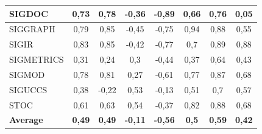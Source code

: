 \begin{table}[!htb]
{\begin{tabular}{|l|c|c|c|c|c|c|c|}
SIGDOC & 0,73 & 0,78 & -0,36 & -0,89 & 0,66 & 0,76 & 0,05\\ \hline
SIGGRAPH & 0,79 & 0,85 & -0,45 & -0,75 & 0,94 & 0,88 & 0,55\\ \hline
SIGIR & 0,83 & 0,85 & -0,42 & -0,77 & 0,7 & 0,89 & 0,88\\ \hline
SIGMETRICS & 0,31 & 0,24 & 0,3 & -0,44 & 0,37 & 0,64 & 0,43\\ \hline
SIGMOD & 0,78 & 0,81 & 0,27 & -0,61 & 0,77 & 0,87 & 0,68\\ \hline
SIGUCCS & 0,38 & -0,22 & 0,53 & -0,13 & 0,51 & 0,7 & 0,57\\ \hline
STOC & 0,61 & 0,63 & 0,54 & -0,37 & 0,82 & 0,88 & 0,68\\ \hline
{\bf Average} & {\bf 0,49} & {\bf 0,49} & {\bf -0,11} & {\bf -0,56} & {\bf 0,5} & {\bf 0,59} & {\bf 0,42}\\ \hline
\end{tabular}
}
\end{table}



